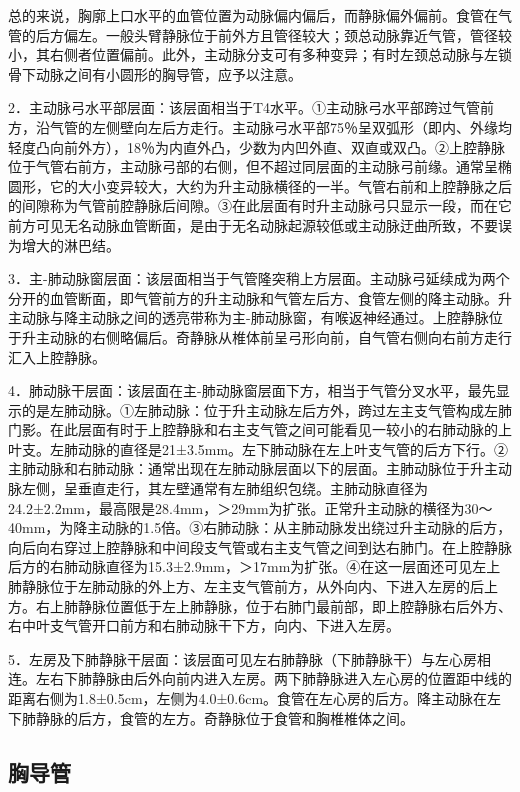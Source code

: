 总的来说，胸廓上口水平的血管位置为动脉偏内偏后，而静脉偏外偏前。食管在气管的后方偏左。一般头臂静脉位于前外方且管径较大；颈总动脉靠近气管，管径较小，其右侧者位置偏前。此外，主动脉分支可有多种变异；有时左颈总动脉与左锁骨下动脉之间有小圆形的胸导管，应予以注意。

2．主动脉弓水平部层面：该层面相当于T4水平。①主动脉弓水平部跨过气管前方，沿气管的左侧壁向左后方走行。主动脉弓水平部75％呈双弧形（即内、外缘均轻度凸向前外方），18％为内直外凸，少数为内凹外直、双直或双凸。②上腔静脉位于气管右前方，主动脉弓部的右侧，但不超过同层面的主动脉弓前缘。通常呈椭圆形，它的大小变异较大，大约为升主动脉横径的一半。气管右前和上腔静脉之后的间隙称为气管前腔静脉后间隙。③在此层面有时升主动脉弓只显示一段，而在它前方可见无名动脉血管断面，是由于无名动脉起源较低或主动脉迂曲所致，不要误为增大的淋巴结。

3．主-肺动脉窗层面：该层面相当于气管隆突稍上方层面。主动脉弓延续成为两个分开的血管断面，即气管前方的升主动脉和气管左后方、食管左侧的降主动脉。升主动脉与降主动脉之间的透亮带称为主-肺动脉窗，有喉返神经通过。上腔静脉位于升主动脉的右侧略偏后。奇静脉从椎体前呈弓形向前，自气管右侧向右前方走行汇入上腔静脉。

4．肺动脉干层面：该层面在主-肺动脉窗层面下方，相当于气管分叉水平，最先显示的是左肺动脉。①左肺动脉：位于升主动脉左后方外，跨过左主支气管构成左肺门影。在此层面有时于上腔静脉和右主支气管之间可能看见一较小的右肺动脉的上叶支。左肺动脉的直径是21±3.5mm。左下肺动脉在左上叶支气管的后方下行。②主肺动脉和右肺动脉：通常出现在左肺动脉层面以下的层面。主肺动脉位于升主动脉左侧，呈垂直走行，其左壁通常有左肺组织包绕。主肺动脉直径为24.2±2.2mm，最高限是28.4mm，＞29mm为扩张。正常升主动脉的横径为30～40mm，为降主动脉的1.5倍。③右肺动脉：从主肺动脉发出绕过升主动脉的后方，向后向右穿过上腔静脉和中间段支气管或右主支气管之间到达右肺门。在上腔静脉后方的右肺动脉直径为15.3±2.9mm，＞17mm为扩张。④在这一层面还可见左上肺静脉位于左肺动脉的外上方、左主支气管前方，从外向内、下进入左房的后上方。右上肺静脉位置低于左上肺静脉，位于右肺门最前部，即上腔静脉右后外方、右中叶支气管开口前方和右肺动脉干下方，向内、下进入左房。

5．左房及下肺静脉干层面：该层面可见左右肺静脉（下肺静脉干）与左心房相连。左右下肺静脉由后外向前内进入左房。两下肺静脉进入左心房的位置距中线的距离右侧为1.8±0.5cm，左侧为4.0±0.6cm。食管在左心房的后方。降主动脉在左下肺静脉的后方，食管的左方。奇静脉位于食管和胸椎椎体之间。

\subsection{胸导管}

